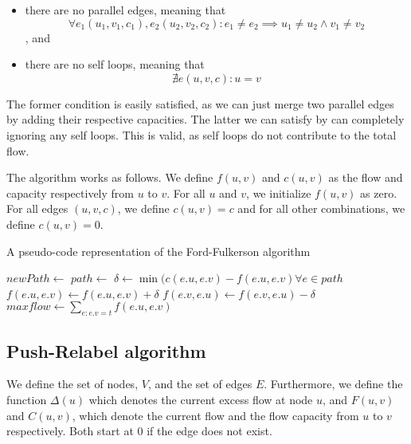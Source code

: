 \begin{itemize}
\item there are no parallel edges, meaning that 
$$
\forall e_1 (u_1, v_1, c_1), e_2(u_2, v_2, c_2): e_1 \neq e_2 \implies u_1 \neq u_2 \land v_1 \neq v_2
$$, and
\item there are no self loops, meaning that
$$
\nexists e (u, v, c): u = v
$$
\end{itemize}

The former condition is easily satisfied, as we can just merge two parallel edges by adding their respective capacities. The latter we can satisfy by can completely ignoring any self loops. This is valid, as self loops do not contribute to the total flow.

The algorithm works as follows. We define $f(u,v)$ and $c(u, v)$ as the flow and capacity respectively from $u$ to $v$. For all $u$ and $v$, we initialize $f(u, v)$ as zero. For all edges $(u, v, c)$, we define $c(u, v) = c$ and for all other combinations, we define $c(u, v) = 0$.

\begin{algorithm}
\caption{A pseudo-code representation of the Ford-Fulkerson algorithm}
\label{algo:ford-fulkerson}
\begin{algorithmic}

		\State {}
	\Else
			\State $newPath \gets$ 
				\State {}
			\EndIf
		\EndFor
		\State \Return{$\emptyset$}
	\EndIf
\EndFunction
\State
{}
	\State $path \gets$ 
	\State $\delta \gets \min(c(e.u, e.v) - f(e.u, e.v) \forall e \in path$
		\State $f(e.u, e.v) \gets f(e.u, e.v) + \delta$
		\State $f(e.v, e.u) \gets f(e.v, e.u) - \delta$
	\EndFor
\EndWhile
\State $maxflow \gets \sum\limits_{e : e.v = t} f(e.u, e.v)$
	
\end{algorithmic}
\end{algorithm}

\subsection{Push-Relabel algorithm}

We define the set of nodes, $V$, and the set of edges $E$. Furthermore, we define the function $\Delta(u)$ which denotes the current excess flow at node $u$, and $F(u, v)$ and $C(u, v)$, which denote the current flow and the flow capacity from $u$ to $v$ respectively. Both start at $0$ if the edge does not exist.

